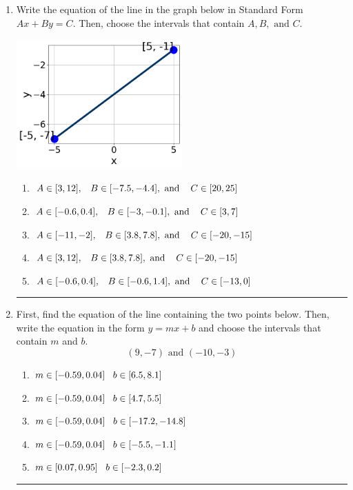 \documentclass[14pt]{extbook}
\newcommand{\litem}[1]{\item#1\hspace*{-1cm}\rule{\textwidth}{0.4pt}}
\begin{document}
\begin{enumerate}
{\begin{enumerate}[label=\Alph*.]
\end{enumerate} }
\litem{
Write the equation of the line in the graph below in Standard Form $Ax+By=C$. Then, choose the intervals that contain $A, B, \text{ and } C$.
\begin{center}
    \includegraphics[width=0.5\textwidth]{../Figures/linearGraphToStandardB.png}
\end{center}
\begin{enumerate}[label=\Alph*.]
\item \( A \in [3, 12], \hspace{3mm} B \in [-7.5, -4.4], \text{ and } \hspace{3mm} C \in [20, 25] \)
\item \( A \in [-0.6, 0.4], \hspace{3mm} B \in [-3, -0.1], \text{ and } \hspace{3mm} C \in [3, 7] \)
\item \( A \in [-11, -2], \hspace{3mm} B \in [3.8, 7.8], \text{ and } \hspace{3mm} C \in [-20, -15] \)
\item \( A \in [3, 12], \hspace{3mm} B \in [3.8, 7.8], \text{ and } \hspace{3mm} C \in [-20, -15] \)
\item \( A \in [-0.6, 0.4], \hspace{3mm} B \in [-0.6, 1.4], \text{ and } \hspace{3mm} C \in [-13, 0] \)

\end{enumerate} }
\litem{
First, find the equation of the line containing the two points below. Then, write the equation in the form $ y=mx+b $ and choose the intervals that contain $m$ and $b$.\[ (9, -7) \text{ and } (-10, -3) \]\begin{enumerate}[label=\Alph*.]
\item \( m \in [-0.59, 0.04] \hspace*{3mm} b \in [6.5, 8.1] \)
\item \( m \in [-0.59, 0.04] \hspace*{3mm} b \in [4.7, 5.5] \)
\item \( m \in [-0.59, 0.04] \hspace*{3mm} b \in [-17.2, -14.8] \)
\item \( m \in [-0.59, 0.04] \hspace*{3mm} b \in [-5.5, -1.1] \)
\item \( m \in [0.07, 0.95] \hspace*{3mm} b \in [-2.3, 0.2] \)


\end{enumerate}}
\end{enumerate}
\end{document}
